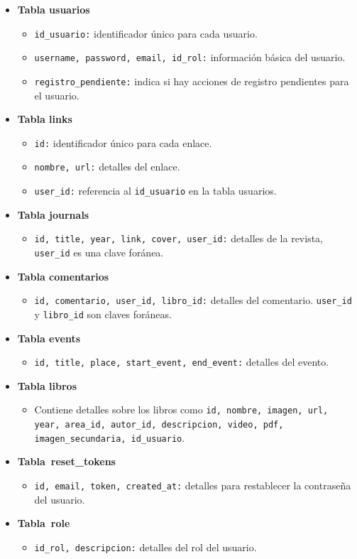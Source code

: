 \documentclass[a4paper, 12pt]{book}
\begin{document}
\begin{itemize}
  \item \textbf{Tabla usuarios}
  \begin{itemize}
  \item \texttt{id\_usuario:} identificador único para cada usuario.
  \item \texttt{username, password, email, id\_rol:} información básica del usuario.
  \item \texttt{registro\_pendiente:} indica si hay acciones de registro pendientes para el usuario.
  \end{itemize}
  \item \textbf{Tabla links}
  \begin{itemize}
  \item \texttt{id:} identificador único para cada enlace.
  \item \texttt{nombre, url:} detalles del enlace.
  \item \texttt{user\_id:} referencia al \texttt{id\_usuario} en la tabla usuarios.
  \end{itemize}
  \item \textbf{Tabla journals}
  \begin{itemize}
  \item \texttt{id, title, year, link, cover, user\_id:} detalles de la revista, \texttt{user\_id} es una clave foránea.
  \end{itemize}
  \item \textbf{Tabla comentarios}
  \begin{itemize}
  \item \texttt{id, comentario, user\_id, libro\_id:} detalles del comentario. \texttt{user\_id} y \texttt{libro\_id} son claves foráneas.
  \end{itemize}
  \item \textbf{Tabla events}
  \begin{itemize}
  \item \texttt{id, title, place, start\_event, end\_event:} detalles del evento.
  \end{itemize}
  \item \textbf{Tabla libros}
  \begin{itemize}
  \item Contiene detalles sobre los libros como \texttt{id, nombre, imagen, url, year, area\_id, autor\_id, descripcion, video, pdf, imagen\_secundaria, id\_usuario}.
  \end{itemize}
  \item \textbf{Tabla\ reset\_tokens}
  \begin{itemize}
  \item \texttt{id, email, token, created\_at:} detalles para restablecer la contraseña del usuario.
  \end{itemize}
  \item \textbf{Tabla\ role}
  \begin{itemize}
  \item \texttt{id\_rol, descripcion:} detalles del rol del usuario.
  \end{itemize}
  \end{itemize}
\end{document}
